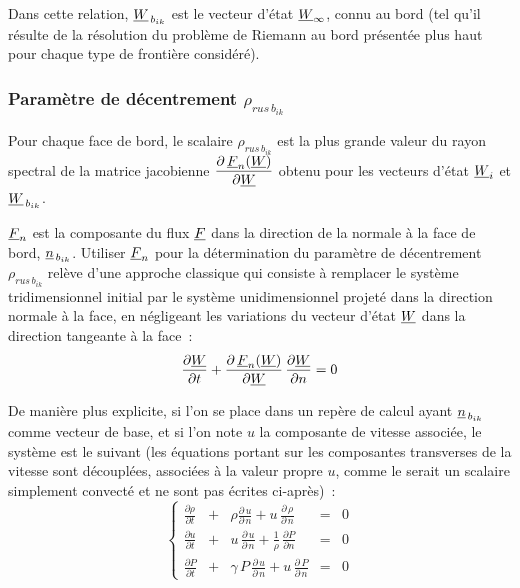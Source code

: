 Dans cette relation, $\underline{W}_{\,{b}_{ik}}$ est  le vecteur d'état
$\underline{W}_{\infty}$, connu au bord (tel
qu'il résulte de la résolution du problème de Riemann au bord
présentée plus haut pour chaque type de frontière considéré).

\subsubsection*{Paramètre de décentrement $\rho_{rus\,{b}_{ik}}$}

Pour chaque face de bord, le scalaire $\rho_{rus\,{b}_{ik}}$ est la
plus grande valeur du rayon spectral de la matrice jacobienne
$\displaystyle\frac{\partial\,\underline{F}_n(\underline{W})}{\partial \underline{W}}$
obtenu pour les vecteurs d'état $\underline{W}_i$ et $\underline{W}_{\,{b}_{ik}}$.

$\underline{F}_n$ est la composante du
flux $\underline{F}$ dans la direction de la normale à la face de bord,
$\underline{n}_{\,{b}_{ik}}$. Utiliser $\underline{F}_n$
pour la détermination du
paramètre de décentrement $\rho_{rus\,{b}_{ik}}$
relève d'une approche classique qui consiste
à remplacer le système tridimensionnel
initial par le système unidimensionnel projeté dans la direction
normale à la face, en négligeant les variations du vecteur d'état
$\underline{W}$ dans la direction tangeante à la face~:
\begin{equation}
\displaystyle\frac{\partial \underline{W}}{\partial t} +\frac{\partial\,\underline{F}_n(\underline{W})}{\partial
\underline{W}}\,\frac{\partial \underline{W}}{\partial n} = 0
\end{equation}

De manière plus explicite, si l'on se place dans un repère de calcul ayant
$\underline{n}_{\,{b}_{ik}}$ comme  vecteur de base, et si l'on note $u$ la
composante de vitesse associée, le système est le suivant (les équations
portant sur les composantes transverses de la vitesse sont découplées,
associées à la valeur propre $u$, comme le serait un scalaire simplement
convecté et ne sont pas écrites ci-après)~:
\begin{equation}
\left\{\begin{array}{lllll}
\displaystyle\frac{\partial\rho}{\partial t}
&+&\displaystyle\rho\frac{\partial\,u}{\partial\,n} + u\,\frac{\partial\,\rho}{\partial\,n}&=& 0 \\
\displaystyle\frac{\partial u}{\partial t}
&+&\displaystyle u\,\frac{\partial\,u}{\partial\,n}+\frac{1}{\rho}\,\frac{\partial
P}{\partial n} &=& 0 \\
\displaystyle\frac{\partial P}{\partial t}
&+&\displaystyle\gamma\,P\,\frac{\partial\,u}{\partial\,n}+u\,\frac{\partial\,P}{\partial\,n}&=& 0
\end{array}\right.
\end{equation}


